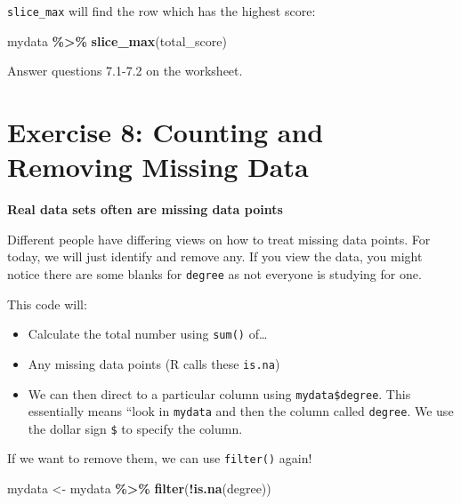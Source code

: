 \documentclass[
]{book}
\newenvironment{Shaded}{\begin{snugshade}}{\end{snugshade}}
\newcommand{\FunctionTok}[1]{\textcolor[rgb]{0.13,0.29,0.53}{\textbf{#1}}}
\newcommand{\NormalTok}[1]{#1}
\newcommand{\OtherTok}[1]{\textcolor[rgb]{0.56,0.35,0.01}{#1}}
\newcommand{\SpecialCharTok}[1]{\textcolor[rgb]{0.81,0.36,0.00}{\textbf{#1}}}
\let\oldsection\section
\renewcommand{\section}{\needspace{5\baselineskip}\oldsection}
\begin{document}
\texttt{slice\_max} will find the row which has the highest score:

\begin{Shaded}
\begin{Highlighting}[]
\NormalTok{mydata }\SpecialCharTok{\%\textgreater{}\%}
  \FunctionTok{slice\_max}\NormalTok{(total\_score)}
\end{Highlighting}
\end{Shaded}

Answer questions 7.1-7.2 on the worksheet.

\section{Exercise 8: Counting and Removing Missing Data}\label{exercise-8-counting-and-removing-missing-data}

\textbf{Real data sets often are missing data points}

Different people have differing views on how to treat missing data points. For today, we will just identify and remove any. If you view the data, you might notice there are some blanks for \texttt{degree} as not everyone is studying for one.

\begin{Shaded}
\end{Shaded}

This code will:

\begin{itemize}
\item
  Calculate the total number using \texttt{sum()} of\ldots{}
\item
  Any missing data points (R calls these \texttt{is.na})
\item
  We can then direct to a particular column using \texttt{mydata\$degree}. This essentially means ``look in \texttt{mydata} and then the column called \texttt{degree}. We use the dollar sign \texttt{\$} to specify the column.
\end{itemize}

If we want to remove them, we can use \texttt{filter()} again!

\begin{Shaded}
\begin{Highlighting}[]
\NormalTok{mydata }\OtherTok{\textless{}{-}}\NormalTok{ mydata }\SpecialCharTok{\%\textgreater{}\%} 
  \FunctionTok{filter}\NormalTok{(}\SpecialCharTok{!}\FunctionTok{is.na}\NormalTok{(degree))}
\end{Highlighting}
\end{Shaded}
\end{document}
